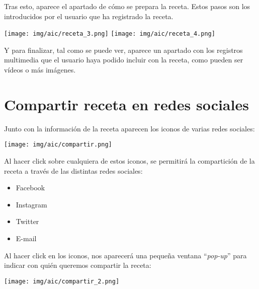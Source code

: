 \documentclass{\ClassPath/viu-tfm-template}
\begin{document}
Tras esto, aparece el apartado de cómo se prepara la receta. Estos pasos son los introducidos por el usuario que ha registrado la receta.


\begin{center}
    \vspace{-10pt}
    \texttt{[image: img/aic/receta\_3.png]}
    \texttt{[image: img/aic/receta\_4.png]}
    \vspace{-20pt}
\end{center}

Y para finalizar, tal como se puede ver, aparece un apartado con los registros multimedia que el usuario haya podido incluir con la receta, como pueden ser vídeos o más imágenes.


\section{Compartir receta en redes sociales}

Junto con la información de la receta aparecen los iconos de varias redes sociales:

\begin{center}
    \vspace{-10pt}
    \texttt{[image: img/aic/compartir.png]}
    \vspace{-20pt}
\end{center}

Al hacer click sobre cualquiera de estos iconos, se permitirá la compartición de la receta a través de las distintas redes sociales:

\begin{itemize}
    \item Facebook
    \item Instagram
    \item Twitter
    \item E-mail
\end{itemize}
\vspace{-1em}

Al hacer click en los iconos, nos aparecerá una pequeña ventana “\textit{pop-up}” para indicar con quién queremos compartir la receta:

\begin{center}
    \vspace{-10pt}
    \texttt{[image: img/aic/compartir\_2.png]}
    \vspace{-20pt}
\end{center}
\end{document}
